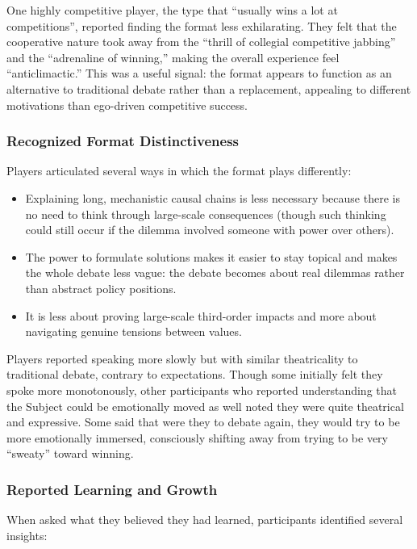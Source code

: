 One highly competitive player, the type that ``usually wins a lot at competitions'', reported finding the format less exhilarating. They felt that the cooperative nature took away from the ``thrill of collegial competitive jabbing'' and the ``adrenaline of winning,'' making the overall experience feel ``anticlimactic.'' This was a useful signal: the format appears to function as an alternative to traditional debate rather than a replacement, appealing to different motivations than ego-driven competitive success.

\subsubsection{Recognized Format Distinctiveness}

Players articulated several ways in which the format plays differently:

\begin{itemize}
    \item Explaining long, mechanistic causal chains is less necessary because there is no need to think through large-scale consequences (though such thinking could still occur if the dilemma involved someone with power over others).
    \item The power to formulate solutions makes it easier to stay topical and makes the whole debate less vague: the debate becomes about real dilemmas rather than abstract policy positions.
    \item It is less about proving large-scale third-order impacts and more about navigating genuine tensions between values.
\end{itemize}

Players reported speaking more slowly but with similar theatricality to traditional debate, contrary to expectations. Though some initially felt they spoke more monotonously, other participants who reported understanding that the Subject could be emotionally moved as well noted they were quite theatrical and expressive. Some said that were they to debate again, they would try to be more emotionally immersed, consciously shifting away from trying to be very ``sweaty'' toward winning.

\subsubsection{Reported Learning and Growth}

When asked what they believed they had learned, participants identified several insights:

